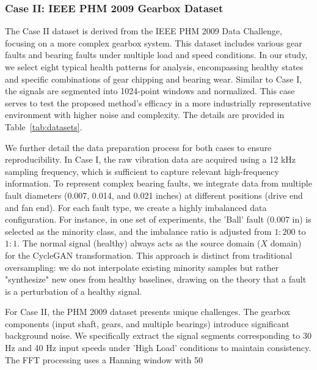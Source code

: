 \subsubsection{Case II: IEEE PHM 2009 Gearbox Dataset}
The Case II dataset is derived from the IEEE PHM 2009 Data Challenge, focusing on a more complex gearbox system. This dataset includes various gear faults and bearing faults under multiple load and speed conditions. In our study, we select eight typical health patterns for analysis, encompassing healthy states and specific combinations of gear chipping and bearing wear. Similar to Case I, the signals are segmented into 1024-point windows and normalized. This case serves to test the proposed method's efficacy in a more industrially representative environment with higher noise and complexity. The details are provided in Table~\ref{tab:datasets}.

We further detail the data preparation process for both cases to ensure reproducibility. In Case I, the raw vibration data are acquired using a 12 kHz sampling frequency, which is sufficient to capture relevant high-frequency information. To represent complex bearing faults, we integrate data from multiple fault diameters (0.007, 0.014, and 0.021 inches) at different positions (drive end and fan end). For each fault type, we create a highly imbalanced data configuration. For instance, in one set of experiments, the 'Ball' fault (0.007 in) is selected as the minority class, and the imbalance ratio is adjusted from $1:200$ to $1:1$. The normal signal (healthy) always acts as the source domain ($X$ domain) for the CycleGAN transformation. This approach is distinct from traditional oversampling: we do not interpolate existing minority samples but rather "synthesize" new ones from healthy baselines, drawing on the theory that a fault is a perturbation of a healthy signal.

For Case II, the PHM 2009 dataset presents unique challenges. The gearbox components (input shaft, gears, and multiple bearings) introduce significant background noise. We specifically extract the signal segments corresponding to 30 Hz and 40 Hz input speeds under 'High Load' conditions to maintain consistency. The FFT processing uses a Hanning window with 50%

